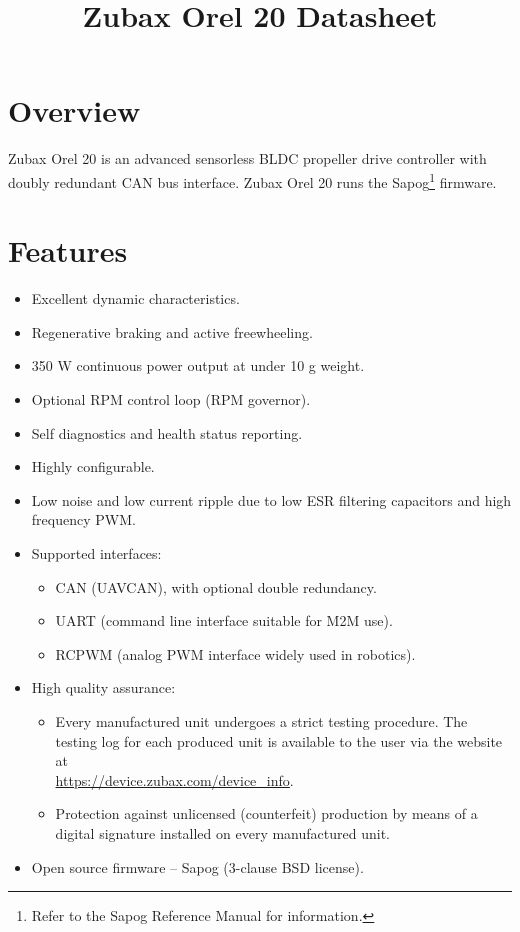 \documentclass{zubaxdoc}
\title{Zubax Orel 20 Datasheet}
\begin{document}
\frontmatter

\begin{titlepage}

\section*{Overview}

Zubax Orel 20 is an advanced sensorless BLDC propeller drive controller with doubly redundant CAN bus interface.
Zubax Orel 20 runs the Sapog\footnote{Refer to the Sapog Reference Manual for information.}
firmware.

\section*{Features}

\begin{itemize}
    \item Excellent dynamic characteristics.
    \item Regenerative braking and active freewheeling.
    \item 350 W continuous power output at under 10 g weight.
    \item Optional RPM control loop (RPM governor).
    \item Self diagnostics and health status reporting.
    \item Highly configurable.
    \item Low noise and low current ripple due to low ESR filtering capacitors and high frequency PWM.
    \item Supported interfaces:
    \begin{itemize}
        \item CAN (UAVCAN), with optional double redundancy.
        \item UART (command line interface suitable for M2M use).
        \item RCPWM (analog PWM interface widely used in robotics).
    \end{itemize}
    \item High quality assurance:
    \begin{itemize}
        \item Every manufactured unit undergoes a strict testing procedure.
        The testing log for each produced unit is available to the user via the website at\\
        \url{https://device.zubax.com/device_info}.
        \item Protection against unlicensed (counterfeit) production by means of a digital signature
        installed on every manufactured unit.
    \end{itemize}
    \item Open source firmware -- Sapog (3-clause BSD license).
\end{itemize}


\end{titlepage}
\end{document}
